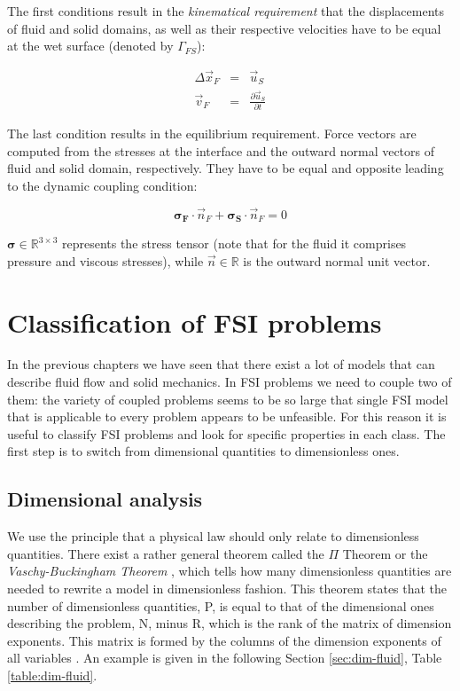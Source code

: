 The first conditions result in the \textit{kinematical requirement} that the displacements of fluid and solid domains, as well as their respective velocities have to be equal at the wet surface (denoted by $\Gamma_{FS}$): 

\begin{eqnarray}
 \Delta\vec{x}_F &=& \vec{u}_S \\
 \vec{v}_F &=& \frac{\partial \vec{u}_S}{\partial t}
\end{eqnarray}

The last condition results in the equilibrium requirement. Force vectors are computed from the stresses at the interface and the outward normal vectors of fluid and solid domain, respectively. They have to be equal and opposite leading to the dynamic coupling condition:

\begin{equation}
\bm{\sigma_F} \cdot \vec{n}_F + \bm{\sigma_S} \cdot \vec{n}_F = 0
\end{equation}

$\bm{\sigma} \in \mathbb{R}^{3 \times 3}$ represents the stress tensor (note that for the fluid it comprises pressure and viscous stresses), while $\vec{n} \in \mathbb{R}$ is the outward normal unit vector.


\section{Classification of FSI problems}
\label{sec:classification}

In the previous chapters we have seen that there exist a lot of models that can describe fluid flow and solid mechanics. In FSI problems we need to couple two of them: the variety of coupled problems seems to be so large that  single FSI model that is applicable to every problem appears to be unfeasible. For this reason it is useful to classify FSI problems and look for specific properties in each class.  
The first step is to switch from dimensional quantities to dimensionless ones.


\subsection{Dimensional analysis}
\label{sec:dimensional}

We use the principle that a physical law should only relate to dimensionless quantities.  
There exist a rather general theorem called the $\Pi$ Theorem or the \textit{Vaschy-Buckingham Theorem} \cite{HancheOlsen2004}, which tells how many dimensionless quantities are needed to rewrite a model in dimensionless fashion.
This theorem states that the number of dimensionless quantities, P, is equal to that of the dimensional ones describing the problem, N, minus R, which is the rank of the matrix of dimension exponents. This matrix is formed by the columns of the dimension exponents of all variables \cite{hardtke2019buckingham}. An example is given in the following Section \ref{sec:dim-fluid}, Table \ref{table:dim-fluid}.

